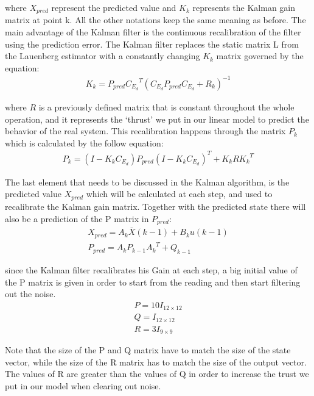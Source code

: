 \documentclass[twocolumn,showpacs,
    nofootinbib,aps,superscriptaddress,
    eqsecnum,prd,showkeys,10pt,floatfix]{revtex4}
\begin{document}
\par
where $X_{pred}$ represent the predicted value and $K_k$ represents the Kalman
gain matrix at point k. All the other notations keep the same meaning as
before. The main advantage of the Kalman filter is the continuous recalibration
of the filter using the prediction error. The Kalman filter replaces the static
matrix L from the Lauenberg estimator with a constantly changing $K_k$ matrix
governed by the equation:
\begin{align}
    K_k=P_{pred}{C_{E_d}}^T{(C_{E_d}P_{pred}C_{E_d}+R_k)}^{-1}
\end{align}
\par
where $R$ is a previously defined matrix that is constant throughout the whole
operation, and it represents the `thrust' we put in our linear model to predict
the behavior of the real system. This recalibration happens through the matrix
$P_k$ which is calculated by the follow equation:
\begin{align}
    P_k=(I-K_{k}C_{E_d})P_{pred}{(I-K_{k}C_{E_d})}^T+K_{k}R{K_k}^T
    \label{KalmanPRecalibration}
\end{align}
\par
The last element that needs to be discussed in the Kalman algorithm, is the
predicted value $X_{pred}$ which will be calculated at each step, and used to
recalibrate the Kalman gain matrix. Together with the predicted state there
will also be a prediction of the P matrix in $P_{pred}$:
\begin{align}
    X_{pred}=A_k\bar{X}(k-1)+B_{k}u(k-1) \\
    P_{pred}=A_{k}P_{k-1}{A_k}^T+Q_{k-1}
    \label{KalmanPrediction}
\end{align}
\par
since the Kalman filter recalibrates his Gain at each step, a big initial value
of the P matrix is given in order to start from the reading and then start
filtering out the noise.
\begin{align}
    P=10I_{12\times12} \\
    Q=I_{12\times12}   \\
    R=3I_{9\times9}
    \label{MatrixValuesOfKalman}
\end{align}
\par
Note that the size of the P and Q matrix have to match the size of the state
vector, while the size of the R matrix has to match the size of the output
vector. The values of R are greater than the values of Q in order to increase
the trust we put in our model when clearing out noise.
\end{document}
